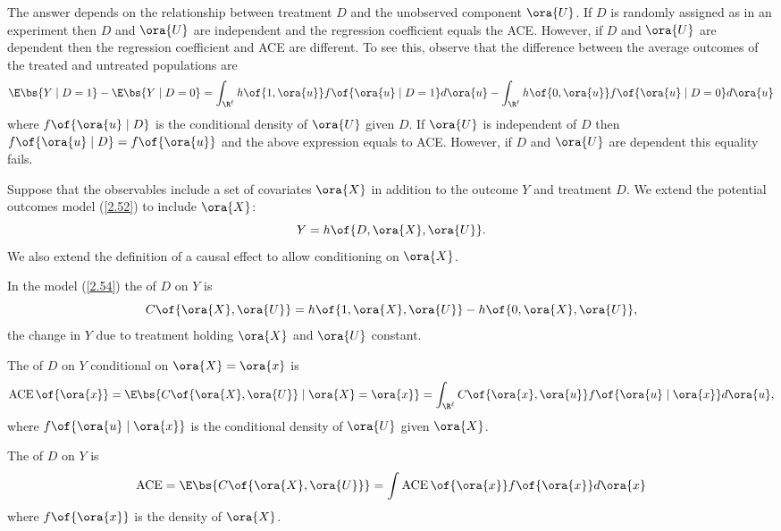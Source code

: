 The answer depends on the relationship between treatment $D$ and the unobserved component $\ora{U}$. If $D$ is randomly assigned as in an experiment then $D$ and $\ora{U}$ are independent and the regression coefficient equals the ACE. However, if $D$ and $\ora{U}$ are dependent then the regression coefficient and ACE are different. To see this, observe that the difference between the average outcomes of the treated and untreated populations are
\begin{equation}
    \notag
    \E\bs{Y \mid D = 1} - \E\bs{Y \mid D = 0} = \int_{\R^\ell} h\of{1, \ora{u}} f\of{\ora{u} \mid D = 1} d\ora{u} - \int_{\R^\ell} h\of{0, \ora{u}} f\of{\ora{u} \mid D = 0} d\ora{u}
\end{equation}
where $f\of{\ora{u} \mid D}$ is the conditional density of $\ora{U}$ given $D$. If $\ora{U}$ is independent of $D$ then $f\of{\ora{u} \mid D} = f\of{\ora{u}}$ and the above expression equals to ACE. However, if $D$ and $\ora{U}$ are dependent this equality fails.

Suppose that the observables include a set of covariates $\ora{X}$ in addition to the outcome $Y$ and treatment $D$. We extend the potential outcomes model (\ref{2.52}) to include $\ora{X}$:
\begin{equation}
    \label{2.54}
    Y = h\of{D, \ora{X}, \ora{U}}.
\end{equation}
We also extend the definition of a causal effect to allow conditioning on $\ora{X}$.

\begin{definition}
    In the model (\ref{2.54}) the  of $D$ on $Y$ is 
    \begin{equation}
        \notag
        C\of{\ora{X}, \ora{U}} = h\of{1, \ora{X}, \ora{U}} - h\of{0, \ora{X}, \ora{U}},
    \end{equation}
    the change in $Y$ due to treatment holding $\ora{X}$ and $\ora{U}$ constant.

    The  of $D$ on $Y$ conditional on $\ora{X} = \ora{x}$ is
    \begin{equation}
        \notag
        \operatorname*{ACE}\of{\ora{x}} = \E\bs{C\of{\ora{X}, \ora{U}} \mid \ora{X} = \ora{x}} = \int_{\R^\ell} C\of{\ora{x}, \ora{u}} f\of{\ora{u} \mid \ora{x}} d \ora{u},
    \end{equation}
    where $f\of{\ora{u} \mid \ora{x}}$ is the conditional density of $\ora{U}$ given $\ora{X}$.

    The  of $D$ on $Y$ is 
    \begin{equation}
        \notag
        \operatorname{ACE} = \E\bs{C\of{\ora{X}, \ora{U}}} = \int \operatorname*{ACE}\of{\ora{x}} f\of{\ora{x}} d\ora{x}
    \end{equation}
    where $f\of{\ora{x}}$ is the density of $\ora{X}$.
\end{definition}

